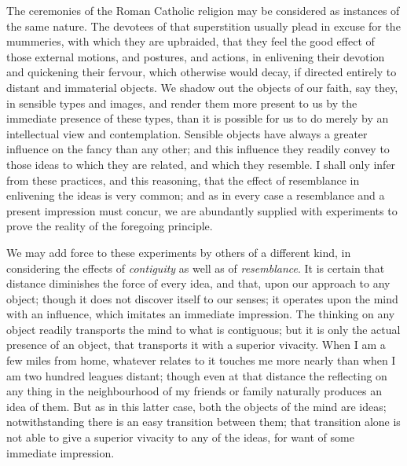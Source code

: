 \documentclass[]{article}
\newcounter{authornote}[page]
\newcommand*{\authornote}[1]{\renewcommand{\thefootnote}{\fnsymbol{footnote}}\stepcounter{authornote}\footnote[\value{authornote}]{#1}\renewcommand{\thefootnote}{\arabic{footnote}}}
\begin{document}
\begin{sectionbody}
\humeparagraph  The ceremonies of the Roman Catholic religion may be considered as instances of the same nature. The devotees of that superstition usually plead in excuse for the mummeries, with which they are upbraided, that they feel the good effect of those external motions, and postures, and actions, in enlivening their devotion and quickening their fervour, which otherwise would decay, if directed entirely to distant and immaterial objects. We shadow out the objects of our faith, say they, in sensible types and images, and render them more present to us by the immediate presence of these types, than it is possible for us to do merely by an intellectual view and contemplation. Sensible objects have always a greater influence on the fancy than any other; and this influence they readily convey to those ideas to which they are related, and which they resemble. I shall only infer from these practices, and this reasoning, that the effect of resemblance in enlivening the ideas is very common; and as in every case a resemblance and a present impression must concur, we are abundantly supplied with experiments to prove the reality of the foregoing principle.

\humeparagraph  We may add force to these experiments by others of a different kind, in considering the effects of \emph{contiguity} as well as of \emph{resemblance}. It is certain that distance diminishes the force of every idea, and that, upon our approach to any object; though it does not discover itself to our senses; it operates upon the mind with an influence, which imitates an immediate impression. The thinking on any object readily transports the mind to what is contiguous; but it is only the actual presence of an object, that transports it with a superior vivacity. When I am a few miles from home, whatever relates to it touches me more nearly than when I am two hundred leagues distant; though even at that distance the reflecting on any thing in the neighbourhood of my friends or family naturally produces an idea of them. But as in this latter case, both the objects of the mind are ideas; notwithstanding there is an easy transition between them; that transition alone is not able to give a superior vivacity to any of the ideas, for want of some immediate impression.%


\end{sectionbody}
\end{document}
